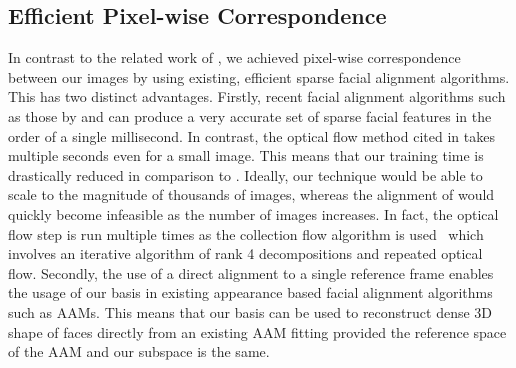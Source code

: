 \subsection{Efficient Pixel-wise Correspondence}\label{subsec:imag_coll_correspondence}
In contrast to the related work of \citet{KemelmacherShlizerman:2013iv},
we achieved pixel-wise correspondence between our images by using existing,
efficient sparse facial alignment algorithms. This has two distinct advantages.
Firstly, recent facial alignment algorithms such as those by
\citet{ren2014face} and \citet{kazemi2014one} can produce a very accurate set
of sparse facial features in the order of a single millisecond. In contrast, the
optical flow method cited in \citet{KemelmacherShlizerman:2013iv} takes multiple
seconds even for a small image. This means that our training time is drastically
reduced in comparison to \citet{KemelmacherShlizerman:2013iv}.
Ideally, our technique would be able to scale
to the magnitude of thousands of images, whereas the alignment of
\citet{KemelmacherShlizerman:2013iv} would quickly become infeasible as the
number of images increases. In fact, the optical flow step is run multiple times as the
collection flow algorithm is used~\cite{kemelmacher2012collection} which involves an
iterative algorithm of rank 4 decompositions and repeated optical flow.
Secondly, the use of a direct alignment to a single reference frame enables
the usage of our basis in existing appearance based facial alignment algorithms
such as AAMs. This means that our basis can be used to reconstruct dense 3D
shape of faces directly from an existing AAM fitting provided the reference
space of the AAM and our subspace is the same.
